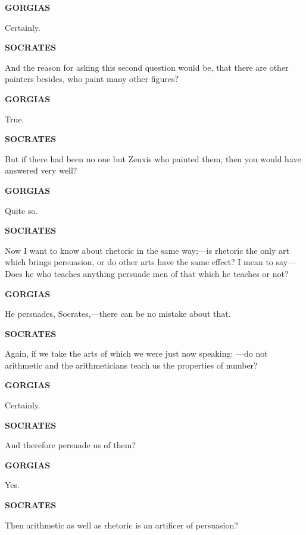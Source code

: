\documentclass[11pt,letter]{article}
\begin{document}
\par \textbf{GORGIAS}
\par   Certainly.

\par \textbf{SOCRATES}
\par   And the reason for asking this second question would be, that there are other painters besides, who paint many other figures?

\par \textbf{GORGIAS}
\par   True.

\par \textbf{SOCRATES}
\par   But if there had been no one but Zeuxis who painted them, then you would have answered very well?

\par \textbf{GORGIAS}
\par   Quite so.

\par \textbf{SOCRATES}
\par   Now I want to know about rhetoric in the same way;—is rhetoric the only art which brings persuasion, or do other arts have the same effect? I mean to say—Does he who teaches anything persuade men of that which he teaches or not?

\par \textbf{GORGIAS}
\par   He persuades, Socrates,—there can be no mistake about that.

\par \textbf{SOCRATES}
\par   Again, if we take the arts of which we were just now speaking: —do not arithmetic and the arithmeticians teach us the properties of number?

\par \textbf{GORGIAS}
\par   Certainly.

\par \textbf{SOCRATES}
\par   And therefore persuade us of them?

\par \textbf{GORGIAS}
\par   Yes.

\par \textbf{SOCRATES}
\par   Then arithmetic as well as rhetoric is an artificer of persuasion?
\end{document}
